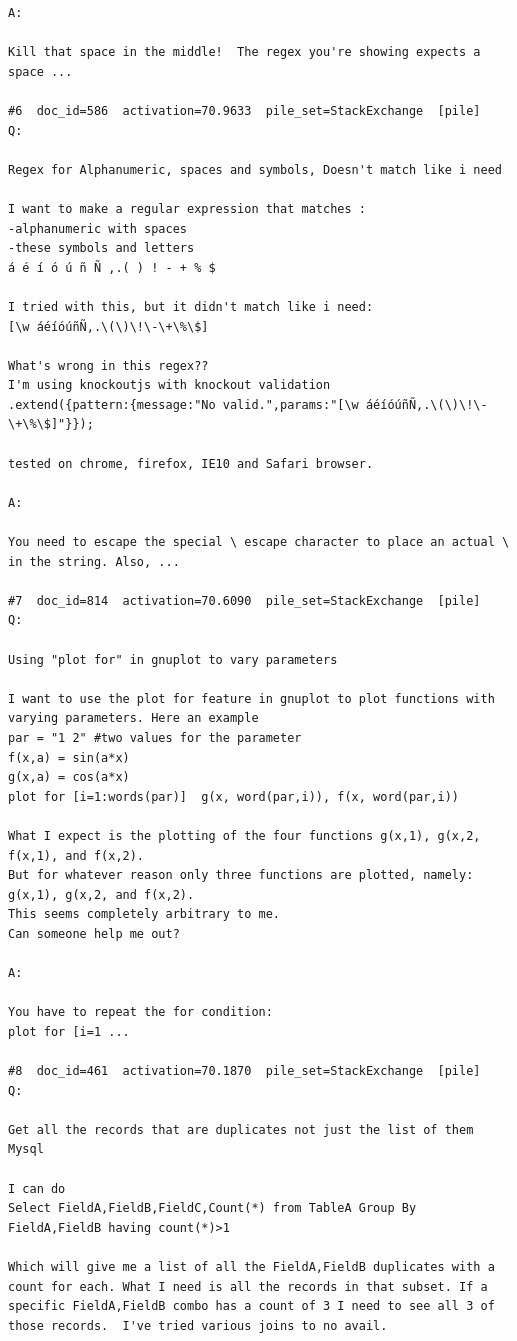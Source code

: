 \begin{verbatim}
A:

Kill that space in the middle!  The regex you're showing expects a space ...

#6  doc_id=586  activation=70.9633  pile_set=StackExchange  [pile]
Q:

Regex for Alphanumeric, spaces and symbols, Doesn't match like i need

I want to make a regular expression that matches :
-alphanumeric with spaces 
-these symbols and letters 
á é í ó ú ñ Ñ ,.( ) ! - + % $

I tried with this, but it didn't match like i need:
[\w áéíóúñÑ,.\(\)\!\-\+\%\$]

What's wrong in this regex??
I'm using knockoutjs with knockout validation 
.extend({pattern:{message:"No valid.",params:"[\w áéíóúñÑ,.\(\)\!\-\+\%\$]"}});

tested on chrome, firefox, IE10 and Safari browser.

A:

You need to escape the special \ escape character to place an actual \ in the string. Also, ...

#7  doc_id=814  activation=70.6090  pile_set=StackExchange  [pile]
Q:

Using "plot for" in gnuplot to vary parameters

I want to use the plot for feature in gnuplot to plot functions with varying parameters. Here an example
par = "1 2" #two values for the parameter
f(x,a) = sin(a*x)
g(x,a) = cos(a*x)
plot for [i=1:words(par)]  g(x, word(par,i)), f(x, word(par,i))

What I expect is the plotting of the four functions g(x,1), g(x,2, f(x,1), and f(x,2).
But for whatever reason only three functions are plotted, namely: g(x,1), g(x,2, and f(x,2).
This seems completely arbitrary to me.
Can someone help me out?

A:

You have to repeat the for condition:
plot for [i=1 ...

#8  doc_id=461  activation=70.1870  pile_set=StackExchange  [pile]
Q:

Get all the records that are duplicates not just the list of them Mysql

I can do
Select FieldA,FieldB,FieldC,Count(*) from TableA Group By FieldA,FieldB having count(*)>1

Which will give me a list of all the FieldA,FieldB duplicates with a count for each. What I need is all the records in that subset. If a specific FieldA,FieldB combo has a count of 3 I need to see all 3 of those records.  I've tried various joins to no avail.


\end{verbatim}
